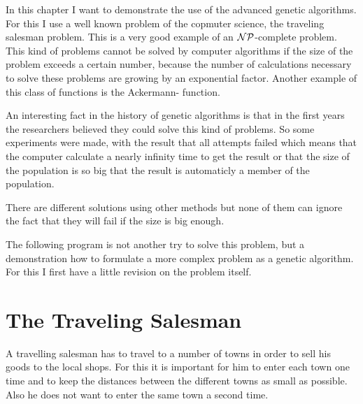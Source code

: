 \label{chap4beg}
In this chapter I want to demonstrate the use of the advanced genetic algorithms.
For this I use a well known problem of the copmuter science, the traveling salesman
problem. This is a very good example of an $\cal{NP}$-complete problem\cite{Hop88}.
This kind of problems cannot be solved by computer algorithms if the size of the
problem exceeds a certain number, because the number of calculations necessary
to solve these problems are growing by an exponential factor. Another example
of this class of functions is the Ackermann- function.

An interesting fact in the history of genetic algorithms is that in the first
years the researchers believed they could solve this kind of problems. So some
experiments were made, with the result that all attempts failed which means
that the computer calculate a nearly infinity time to get the result or that
the size of the population is so big that the result is automaticly a member
of the population.

There are different solutions using other methods but none of them can ignore
the fact that they will fail if the size is big enough.

The following program is not another try to solve this problem, but a demonstration
how to formulate a more complex problem as a genetic algorithm. For this I first
have a little revision on the problem itself.
\section{The Traveling Salesman}
A travelling salesman has to travel to a number of towns in order to sell his
goods to the local shops. For this it is important for him to enter each town
one time and to keep the distances between the different towns as small as possible.
Also he does not want to enter the same town a second time.


